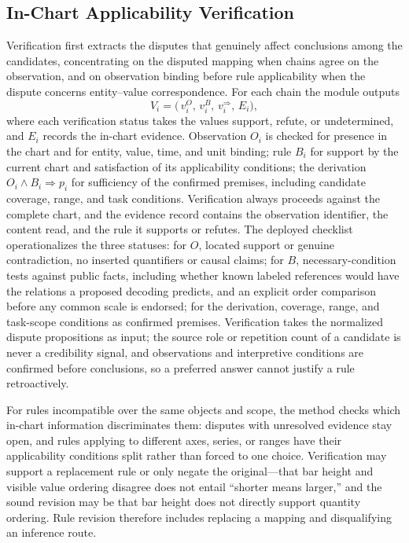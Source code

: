 \subsection{In-Chart Applicability Verification}
\label{sec:method:verify}

Verification first extracts the disputes that genuinely
affect conclusions among the candidates, concentrating
on the disputed mapping when chains agree on the
observation, and on observation binding before rule
applicability when the dispute concerns entity--value
correspondence.
For each chain the module outputs
\begin{equation}\label{eq:vi}
V_i =
\bigl(\,
v_i^{O},\,
v_i^{B},\,
v_i^{\Rightarrow},\,
E_i
\bigr),
\end{equation}
where each verification status takes the values
support, refute, or undetermined, and $E_i$ records the
in-chart evidence.
Observation $O_i$ is checked for presence in the chart
and for entity, value, time, and unit binding; rule
$B_i$ for support by the current chart and satisfaction
of its applicability conditions; the derivation
$O_i\land B_i\Rightarrow p_i$ for sufficiency of the
confirmed premises, including candidate coverage, range,
and task conditions.
Verification always proceeds against the complete
chart, and the evidence record contains the observation
identifier, the content read, and the rule it supports
or refutes.
The deployed checklist operationalizes the three
statuses: for $O$, located support or genuine
contradiction, no inserted quantifiers or causal
claims; for $B$, necessary-condition tests against
public facts, including whether known labeled
references would have the relations a proposed decoding
predicts, and an explicit order comparison before any
common scale is endorsed; for the derivation, coverage,
range, and task-scope conditions as confirmed
premises.
Verification takes the normalized dispute propositions
as input; the source role or repetition count of a
candidate is never a credibility signal, and
observations and interpretive conditions are confirmed
before conclusions, so a preferred answer cannot
justify a rule retroactively.


For rules incompatible over the same objects and scope,
the method checks which in-chart information
discriminates them: disputes with unresolved evidence
stay open, and rules applying to different axes,
series, or ranges have their applicability conditions
split rather than forced to one choice.
Verification may support a replacement rule or only
negate the original---that bar height and visible value
ordering disagree does not entail ``shorter means
larger,'' and the sound revision may be that bar height
does not directly support quantity ordering.
Rule revision therefore includes replacing a mapping
and disqualifying an inference route.

